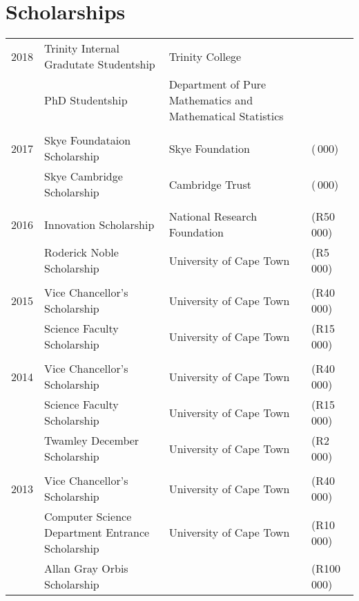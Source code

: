 
\section{Scholarships}

\begin{tabular}{R{1cm}|lll}
2018 & Trinity Internal Gradutate Studentship & Trinity College&\\
     & PhD Studentship & Department of Pure Mathematics and Mathematical Statistics&\\
&&\\
2017 & Skye Foundataion Scholarship & Skye Foundation&\footnotesize(\,000)\normalsize\\
     & Skye Cambridge Scholarship & Cambridge Trust &\footnotesize(\,000)\normalsize\\
&&\\
2016 & Innovation Scholarship & National Research Foundation&\footnotesize(R50\,000)\normalsize\\
     &Roderick Noble Scholarship & University of Cape Town & \footnotesize(R5\,000)\normalsize\\
&&\\
2015 & Vice Chancellor's Scholarship & University of Cape Town &\footnotesize(R40\,000)\normalsize\\
& Science Faculty Scholarship & University of Cape Town &\footnotesize(R15\,000)\normalsize\\
&&\\
2014 & Vice Chancellor's Scholarship & University of Cape Town &\footnotesize(R40\,000)\normalsize\\
& Science Faculty Scholarship & University of Cape Town &\footnotesize(R15\,000)\normalsize\\
& Twamley December Scholarship & University of Cape Town &\footnotesize(R2\,000)\normalsize\\
&&\\
2013 & Vice Chancellor's Scholarship & University of Cape Town &\footnotesize(R40\,000)\normalsize\\
& Computer Science Department Entrance Scholarship & University of Cape Town &\footnotesize(R10\,000)\normalsize\\
& Allan Gray Orbis Scholarship &&\footnotesize(R100\,000)\normalsize\\
\end{tabular}

